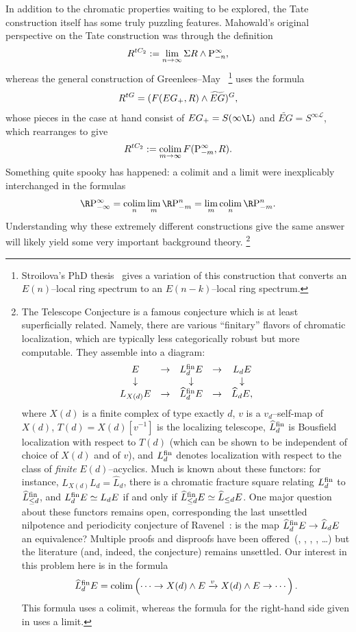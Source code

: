 In addition to the chromatic properties waiting to be explored, the Tate construction itself has some truly puzzling features.
Mahowald's original perspective on the Tate construction was through the definition \[R^{tC_2} := \lim_{n \to \infty} \Sigma R \wedge \mathrm P^\infty_{-n},\] whereas the general construction of Greenlees--May~\cite{GreenleesMay}%
\footnote{%
Stroilova's PhD thesis~\cite{Stroilova} gives a variation of this construction that converts an \(E(n)\)--local ring spectrum to an \(E(n-k)\)--local ring spectrum.
}
uses the formula \[R^{tG} = (F(EG_+, R) \wedge \widetilde{EG})^G,\] whose pieces in the case at hand consist of \(EG_+ = S(\infty \L)\) and \(\widetilde{EG} = S^{\infty \mathcal L}\), which rearranges to give \[R^{tC_2} := \operatorname*{colim}_{m \to \infty} F(\mathrm P^\infty_{-m}, R).\]
Something quite spooky has happened: a colimit and a limit were inexplicably interchanged in the formulas \[\RP^\infty_{-\infty} = \colim_n \lim_m \RP^n_{-m} = \lim_m \colim_n \RP^n_{-m}.\]
Understanding why these extremely different constructions give the same answer will likely yield some very important background theory.%
\footnote{%
The Telescope Conjecture is a famous conjecture which is at least superficially related.
Namely, there are various ``finitary'' flavors of chromatic localization, which are typically less categorically robust but more computable.
They assemble into a diagram:
\[\begin{array}{ccccc}
E & \to & L_d^{\mathrm{fin}} E & \to & L_d E \\
\downarrow & & \downarrow & & \downarrow \\
L_{X(d)} E & \to & \widehat L_d^{\mathrm{fin}} E & \to & \widehat L_d E,
\end{array}\]
where \(X(d)\) is a finite complex of type exactly \(d\), \(v\) is a \(v_d\)--self-map of \(X(d)\), \(T(d) = X(d)[v^{-1}]\) is the localizing telescope, \(\widehat L_d^{\mathrm{fin}}\) is Bousfield localization with respect to \(T(d)\) (which can be shown to be independent of choice of \(X(d)\) and of \(v\)), and \(L_d^{\mathrm{fin}}\) denotes localization with respect to the class of \emph{finite} \(E(d)\)--acyclics.
Much is known about these functors: for instance, \(L_{X(d)} L_d = \widehat L_d\), there is a chromatic fracture square relating \(L_d^{\mathrm{fin}}\) to \(\widehat L_{\le d}^{\mathrm{fin}}\), and \(L_d^{\mathrm{fin}} E \simeq L_d E\) if and only if \(\widehat L_{\le d}^{\mathrm{fin}} E \simeq \widehat L_{\le d} E\).
One major question about these functors remains open, corresponding the last unsettled nilpotence and periodicity conjecture of Ravenel~\cite[Conjecture 10.5]{RavenelLocalizationWRTPeriodic}: is the map \(\widehat L_d^{\mathrm{fin}} E \to \widehat L_d E\) an equivalence?
Multiple proofs and disproofs have been offered~(\cite{RavenelObit}, \cite{MahowaldSadofsky}, \cite{Krause}, \cite{MRS}, \ldots) but the literature (and, indeed, the conjecture) remains unsettled.
Our interest in this problem here is in the formula \[\widehat L_d^{\mathrm{fin}} E = \operatorname*{colim}\left(\cdots \to X(d) \wedge E \xrightarrow{v} X(d) \wedge E \to \cdots\right).\]
This formula uses a colimit, whereas the formula for the right-hand side given in  uses a limit.
}

